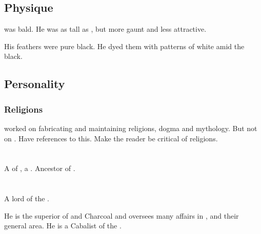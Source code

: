 \subsection{Physique}
\Menessiaraid{} was bald. 
He was as tall as \Teshrial, but more gaunt and less attractive. 

His feathers were pure black.
He dyed them with patterns of white amid the black. 









\subsection{Personality}





\subsubsection{Religions}
\Menessiaraid worked on fabricating and maintaining religions, dogma and mythology. 
But not on \Azmith. 
Have references to this. 
Make the reader be critical of religions. 















\section{\Shehizol}
\index{\Shehizol}
A \resvil{} of \CiriathSepher, a \sathariah. 
Ancestor of . 















\section{\Teshrial}
\index{\Teshrial}
A \resphan{} lord of the \CiriathSepher. 

He is the superior of \Achsah{} and Charcoal and oversees many affairs in \Malcur, \Scyrum{} and their general area. He is a Cabalist of the . 








